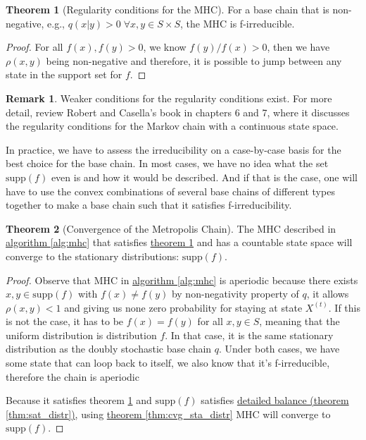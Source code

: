 \documentclass[]{article}
\theoremstyle{definition}
\newtheorem{theorem}{Theorem}       %
\newtheorem{remark}{Remark}[subsection]
{
    \newtheorem{assumption}{Assumption}
}
\begin{document}
        \begin{theorem}[Regularity conditions for the MHC]\label{thm:reg_cond}
            For a base chain that is non-negative, e.g., $q(x|y) > 0\; \forall x, y\in S\times S$, the MHC is f-irreducible. 
        \end{theorem}
        \begin{proof}
            For all $f(x),f(y)>0$, we know $f(y)/f(x) > 0$, then we have $\rho(x,y)$ being non-negative and therefore, it is possible to jump between any state in the support set for $f$. 
        \end{proof}
        \begin{remark}
            Weaker conditions for the regularity conditions exist. For more detail, review Robert and Casella's book \cite{book:robert_casella_2005} in chapters 6 and 7, where it discusses the regularity conditions for the Markov chain with a continuous state space. 
            \par
            In practice, we have to assess the irreducibility on a case-by-case basis for the best choice for the base chain. In most cases, we have no idea what the set $\text{supp}(f)$ even is and how it would be described. And if that is the case, one will have to use the convex combinations of several base chains of different types together to make a base chain such that it satisfies f-irreducibility. 
        \end{remark}
        \begin{theorem}[Convergence of the Metropolis Chain]
            The MHC described in \hyperref[alg:mhc]{algorithm \ref*{alg:mhc}} that satisfies \hyperref[thm:reg_cond]{theorem \ref*{thm:reg_cond}} and has a countable state space will converge to the stationary distributions: $\text{supp}(f)$. 
        \end{theorem}
        \begin{proof}
            Observe that MHC in \hyperref[alg:mhc]{algorithm \ref*{alg:mhc}} is aperiodic because there exists $x, y\in \text{supp}(f)$ with $f(x) \neq f(y)$ by non-negativity property of $q$, it allows $\rho(x, y) < 1$ and giving us none zero probability for staying at state $X^{(t)}$. If this is not the case, it has to be $f(x) = f(y)$ for all $x, y \in S$, meaning that the uniform distribution is distribution $f$. In that case, it is the same stationary distribution as the doubly stochastic base chain $q$. Under both cases, we have some state that can loop back to itself, we also know that it's f-irreducible, therefore the chain is aperiodic 
            \par
            Because it satisfies theorem \ref*{thm:reg_cond} and $\text{supp}(f)$ satisfies \hyperref[thm:sat_distr]{detailed balance (theorem \ref*{thm:sat_distr})}, using \hyperref[thm:cvg_sta_distr]{theorem \ref*{thm:cvg_sta_distr}} MHC will converge to $\text{supp}(f)$. 
        \end{proof}
\end{document}
